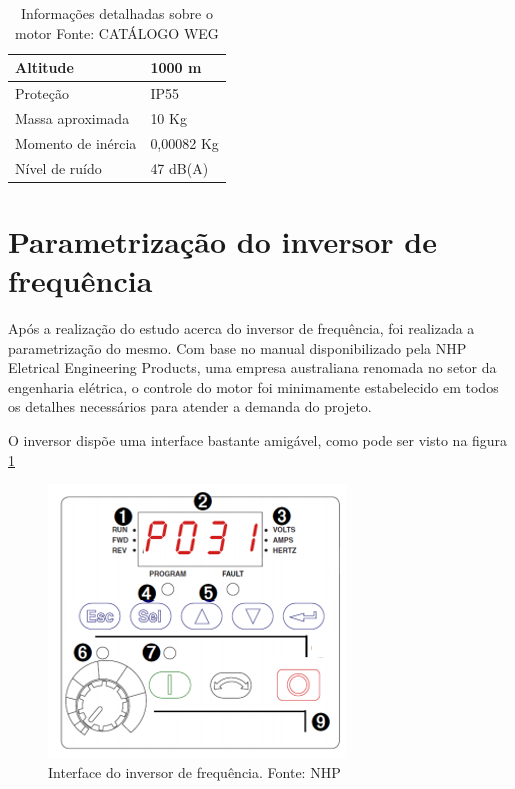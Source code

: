 \begin{table}[h]
\begin{center}
\begin{tabular}{|p{5cm}|p{5cm}|}
                Altitude & 1000 m
                \\ \hline
                Proteção & IP55
                \\ \hline
                Massa aproximada & 10 Kg
                \\ \hline
                Momento de inércia & 0,00082 Kg
                \\ \hline
                Nível de ruído & 47 dB(A)
                \\ \hline
              \end{tabular}
              \caption[Informações detalhadas sobre o motor]{Informações detalhadas sobre o motor
              \protect Fonte: CATÁLOGO WEG }
            \label{tabela_info_motor}
        \end{center}
    \end{table}


\section{Parametrização do inversor de frequência}

Após a realização do estudo acerca do inversor de frequência, foi realizada a parametrização do mesmo. Com base no manual disponibilizado pela NHP Eletrical Engineering Products, uma empresa australiana renomada no setor da engenharia elétrica, o controle do motor foi minimamente estabelecido em todos os detalhes necessários para atender a demanda do projeto.


	O inversor dispõe uma interface bastante amigável, como pode ser visto na figura \ref{Interface do inversor}

\begin{figure}[h!]
	\centering
		\includegraphics[keepaspectratio=true,scale=0.6]{figuras/interface_inversor.png}
	\caption{Interface do inversor de frequência. Fonte: NHP}
    \label{Interface do inversor}
\end{figure}

